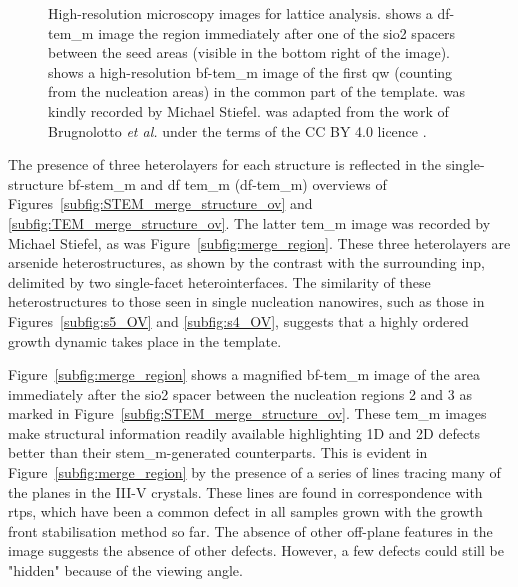 \begin{figure}
{
    }
    \caption[High-resolution microscopy images for the lattice analysis of the merge structures.]{High-resolution microscopy images for lattice analysis.  shows a \acs{df}-\acs{tem_m} image the region immediately after one of the \acs{sio2} spacers between the seed areas (visible in the bottom right of the image).  shows a high-resolution \acs{bf}-\acs{tem_m} image of the first \acl{qw} (counting from the nucleation areas) in the common part of the template.  was kindly recorded by Michael Stiefel.  was adapted from the work of Brugnolotto \textit{et al.} \cite{Brugnolotto2023_2} under the terms of the CC BY 4.0 licence \cite{CCBY40}.}
    \label{fig:merge_high-res}
\end{figure}

The presence of three heterolayers for each structure is reflected in the single-structure \acs{bf}-\acs{stem_m} and \acl{df} \acl{tem_m} (\acs{df}-\acs{tem_m}) overviews of Figures~\ref{subfig:STEM_merge_structure_ov} and \ref{subfig:TEM_merge_structure_ov}. The latter \acs{tem_m} image was recorded by Michael Stiefel, as was Figure~\ref{subfig:merge_region}. These three heterolayers are arsenide heterostructures, as shown by the contrast with the surrounding \acs{inp}, delimited by two single-facet  heterointerfaces. The similarity of these heterostructures to those seen in single nucleation nanowires, such as those in Figures~\ref{subfig:s5_OV} and \ref{subfig:s4_OV}, suggests that a highly ordered growth dynamic takes place in the template.

Figure~\ref{subfig:merge_region} shows a magnified \acs{bf}-\acs{tem_m} image of the area immediately after the \acs{sio2} spacer between the nucleation regions 2 and 3 as marked in Figure~\ref{subfig:STEM_merge_structure_ov}. These \acs{tem_m} images make structural information readily available highlighting 1D and 2D defects better than their \acs{stem_m}-generated counterparts. This is evident in Figure~\ref{subfig:merge_region} by the presence of a series of lines tracing many of the  planes in the III-V crystals. These lines are found in correspondence with \acs{rtp}s, which have been a common defect in all samples grown with the  growth front stabilisation method so far. The absence of other off-plane features in the image suggests the absence of other defects. However, a few defects could still be "hidden" because of the viewing angle.

